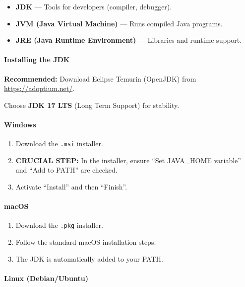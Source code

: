 \documentclass[
  justified,
  openright,
]{tufte-book}
\let\subsubsection\paragraph
\let\paragraph\paragraph
\let\subsubsection\paragraph
\let\paragraph\paragraph
\providecommand{\tightlist}{%
  \setlength{\itemsep}{0pt}\setlength{\parskip}{0pt}}
\begin{document}
\begin{itemize}
\tightlist
\item
  \textbf{JDK} --- Tools for developers (compiler, debugger).
\item
  \textbf{JVM (Java Virtual Machine)} --- Runs compiled Java programs.
\item
  \textbf{JRE (Java Runtime Environment)} --- Libraries and runtime
  support.
\end{itemize}

\subsubsection{Installing the JDK}\label{installing-the-jdk}

\textbf{Recommended:} Download Eclipse Temurin (OpenJDK) from
\url{https://adoptium.net/}.

Choose \textbf{JDK 17 LTS} (Long Term Support) for stability.

\paragraph{Windows}\label{windows}

\begin{enumerate}
\def\labelenumi{\arabic{enumi}.}
\tightlist
\item
  Download the \texttt{.msi} installer.
\item
  \textbf{CRUCIAL STEP:} In the installer, ensure ``Set JAVA\_HOME
  variable'' and ``Add to PATH'' are checked.
\item
  Activate ``Install'' and then ``Finish''.
\end{enumerate}

\paragraph{macOS}\label{macos}

\begin{enumerate}
\def\labelenumi{\arabic{enumi}.}
\tightlist
\item
  Download the \texttt{.pkg} installer.
\item
  Follow the standard macOS installation steps.
\item
  The JDK is automatically added to your PATH.
\end{enumerate}

\paragraph{Linux (Debian/Ubuntu)}\label{linux-debianubuntu}
\end{document}

